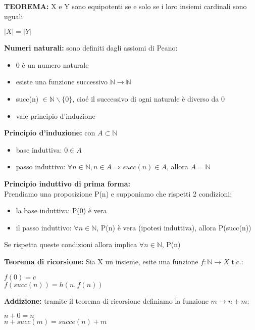 \documentclass[11pt, letterpaper]{article}
\begin{document}
\textbf{TEOREMA:} X e Y sono equipotenti se e solo se i loro insiemi cardinali sono uguali
\begin{center}
    $|X|=|Y|$
\end{center}

\textbf{Numeri naturali:} sono definiti dagli assiomi di Peano:
\begin{itemize}
    \item 0 è un numero naturale
    \item esiste una funzione successivo $\mathbb{N}\rightarrow\mathbb{N}$
    \item succ(n) $\in\mathbb{N}\backslash\{0\}$, cioé il successivo di ogni naturale è diverso da 0
    \item vale principio d'induzione
\end{itemize}

\textbf{Principio d'induzione:} con $A\subset\mathbb{N}$ 
\begin{itemize}
    \item base induttiva: $0\in A$
    \item passo induttivo: $\forall n \in\mathbb{N}, n\in A\Rightarrow succ(n)\in A$, allora $A=\mathbb{N}$
\end{itemize}

\newpage

\textbf{Principio induttivo di prima forma:}\\
Prendiamo una proposizione P(n) e supponiamo che rispetti 2 condizioni:
\begin{itemize}
    \item la base induttiva: P(0) è vera
    \item il passo induttivo: $\forall n \in\mathbb{N}$, P(n) è vera (ipotesi induttiva), allora P(succ(n))
\end{itemize}
Se rispetta queste condizioni allora implica $\forall n\in\mathbb{N}$, P(n)

\textbf{Teorema di ricorsione:} Sia X un insieme, esite una funzione $f:\mathbb{N}\rightarrow X$ t.c.:
\begin{center}
    $f(0) = c$\\
    $f(succ(n))=h(n,f(n))$
\end{center}

\textbf{Addizione:} tramite il teorema di ricorsione definiamo la funzione $m\rightarrow n+m:$
\begin{center}
    $n + 0 = n$\\
    $n+succ(m)=succe(n)+m$
\end{center}
\end{document}
